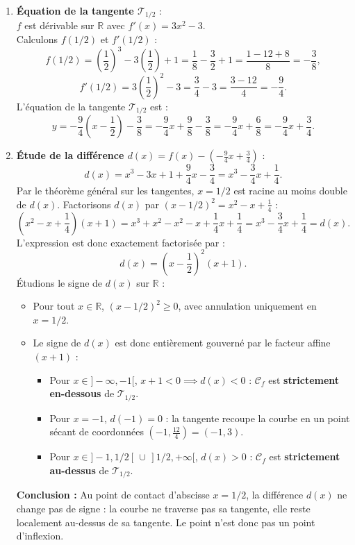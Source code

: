 \documentclass[11pt,a4paper]{article}
\newcommand{\R}{\mathbb{R}}
\begin{document}
\begin{correctionbox}
\begin{enumerate}[label=\textbf{\arabic*.}]
    \item \textbf{Équation de la tangente $\mathcal{T}_{1/2}$} :\\
    $f$ est dérivable sur $\R$ avec $f'(x) = 3x^2 - 3$.\\
    Calculons $f(1/2)$ et $f'(1/2)$ :
    \[
    f(1/2) = \left(\frac{1}{2}\right)^3 - 3\left(\frac{1}{2}\right) + 1 = \frac{1}{8} - \frac{3}{2} + 1 = \frac{1 - 12 + 8}{8} = -\frac{3}{8},
    \]
    \[
    f'(1/2) = 3\left(\frac{1}{2}\right)^2 - 3 = \frac{3}{4} - 3 = \frac{3 - 12}{4} = -\frac{9}{4}.
    \]
    L'équation de la tangente $\mathcal{T}_{1/2}$ est :
    \[
    y = -\frac{9}{4}\left(x - \frac{1}{2}\right) - \frac{3}{8} = -\frac{9}{4}x + \frac{9}{8} - \frac{3}{8} = -\frac{9}{4}x + \frac{6}{8} = -\frac{9}{4}x + \frac{3}{4}.
    \]

    \item \textbf{Étude de la différence $d(x) = f(x) - \left(-\frac{9}{4}x + \frac{3}{4}\right)$} :
    \[
    d(x) = x^3 - 3x + 1 + \frac{9}{4}x - \frac{3}{4} = x^3 - \frac{3}{4}x + \frac{1}{4}.
    \]
    Par le théorème général sur les tangentes, $x = 1/2$ est racine au moins double de $d(x)$. Factorisons $d(x)$ par $(x - 1/2)^2 = x^2 - x + \frac{1}{4}$ :
    \[
    \left(x^2 - x + \frac{1}{4}\right)(x + 1) = x^3 + x^2 - x^2 - x + \frac{1}{4}x + \frac{1}{4} = x^3 - \frac{3}{4}x + \frac{1}{4} = d(x).
    \]
    L'expression est donc exactement factorisée par :
    \[
    d(x) = \left(x - \frac{1}{2}\right)^2 (x + 1).
    \]
    Étudions le signe de $d(x)$ sur $\R$ :
    \begin{itemize}
        \item Pour tout $x \in \R$, $(x - 1/2)^2 \ge 0$, avec annulation uniquement en $x = 1/2$.
        \item Le signe de $d(x)$ est donc entièrement gouverné par le facteur affine $(x + 1)$ :
        \begin{itemize}
            \item Pour $x \in ]-\infty, -1[$, $x + 1 < 0 \implies d(x) < 0$ : $\mathcal{C}_f$ est \textbf{strictement en-dessous} de $\mathcal{T}_{1/2}$.
            \item Pour $x = -1$, $d(-1) = 0$ : la tangente recoupe la courbe en un point sécant de coordonnées $\left(-1, \frac{12}{4}\right) = (-1, 3)$.
            \item Pour $x \in ]-1, 1/2[ \, \cup \, ]1/2, +\infty[$, $d(x) > 0$ : $\mathcal{C}_f$ est \textbf{strictement au-dessus} de $\mathcal{T}_{1/2}$.
        \end{itemize}
    \end{itemize}
    \textbf{Conclusion :} Au point de contact d'abscisse $x = 1/2$, la différence $d(x)$ ne change pas de signe : la courbe ne traverse pas sa tangente, elle reste localement au-dessus de sa tangente. Le point n'est donc pas un point d'inflexion.
\end{enumerate}
\end{correctionbox}
\end{document}
